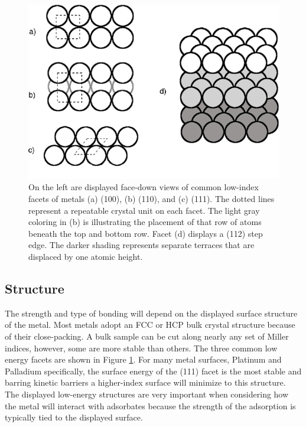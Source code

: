 \begin{figure}
  \includegraphics[width=\linewidth]{../figures/chap1/facets.pdf}
  \caption{On the left are displayed face-down views of common low-index facets
of metals (a) (100), (b) (110), and (c) (111). The dotted lines represent a
repeatable crystal unit on each facet. The light gray coloring in (b) is
illustrating the placement of that row of atoms beneath the top and bottom row.
Facet (d) displays a (112) step edge. The darker shading represents separate
terraces that are displaced by one atomic height.}
\label{fig:facets}
\end{figure}

\subsection{Structure}
The strength and type of bonding will depend on the displayed surface structure
of the metal.  Most metals adopt an FCC or HCP bulk crystal structure because
of their close-packing. A bulk sample can be cut along nearly any set of Miller
indices, however, some are more stable than others.  The three common low
energy facets are shown in Figure \ref{fig:facets}. For many metal surfaces,
Platinum and Palladium specifically, the surface energy of the (111) facet is
the most stable and barring kinetic barriers a higher-index surface will
minimize to this structure. The displayed low-energy structures are very
important when considering how the metal will interact with adsorbates because
the strength of the adsorption is typically tied to the displayed surface.


